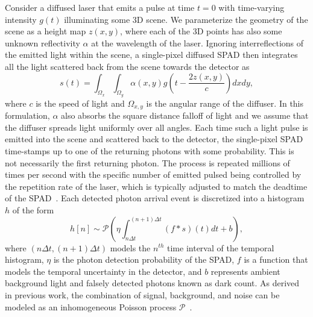 Consider a diffused laser that emits a pulse at time $t = 0$ with time-varying intensity $g(t)$ illuminating some 3D scene. We parameterize the geometry of the scene as a height map $z(x, y)$, where each of the 3D points has also some unknown reflectivity $\alpha$ at the wavelength of the laser. Ignoring interreflections of the emitted light within the scene, a single-pixel diffused SPAD then integrates all the light scattered back from the scene towards the detector as
%
\begin{equation}
	s \left( t \right)= \int_{\Omega_x} \int_{\Omega_y} \alpha \left( x,y \right) g \left( t - \frac{2z(x,y)}{c} \right) dx dy ,
	\label{eq:pulse_integral} 
\end{equation}  
%
where $c$ is the speed of light and $\Omega_{x,y}$ is the angular range of the diffuser. In this formulation, $\alpha$ also absorbs the square distance falloff of light and we assume that the diffuser spreads light uniformly over all angles. Each time such a light pulse is emitted into the scene and scattered back to the detector, the single-pixel SPAD time-stamps up to one of the returning photons with some probability. This is not necessarily the first returning photon. The process is repeated millions of times per second with the specific number of emitted pulsed being controlled by the repetition rate of the laser, which is typically adjusted to match the deadtime of the SPAD~\cite{Heide:2018}. Each detected photon arrival event is discretized into a histogram $h$ of the form
%
\begin{equation}
  h[n] \sim \mathcal{P} \left( \eta \int_{n\Delta t}^{(n+1)\Delta t} \left(f * s \right) \left( t \right)  dt + b \right),	
	\label{eq:spad_measurements}
\end{equation}
%
where $(n\Delta t, (n+1) \Delta t)$ models the $n^{th}$ time interval of the temporal histogram, $\eta$ is the photon detection probability of the SPAD, $f$ is a function that models the temporal uncertainty in the detector, and $b$ represents ambient background light and falsely detected photons known as dark count. As derived in previous work, the combination of signal, background, and noise can be modeled as an inhomogeneous Poisson process $\mathcal{P}$~\cite{Kirmani:2014,Shin2015}.

